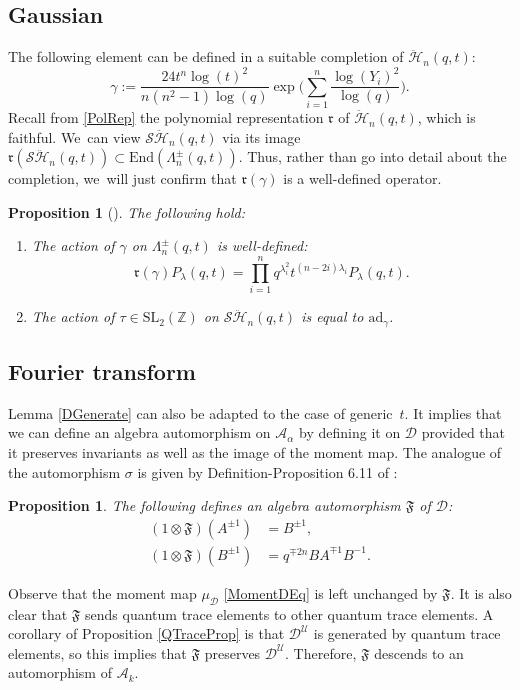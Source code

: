 \documentclass[11pt]{article}
\newcommand{\SL}{\mathrm{SL}}
\newtheorem{prop}[thm]{Proposition}
\theoremstyle{definition}
\newcommand{\ZZ}{\mathbb{Z}}
\newcommand{\UU}{\mathcal{U}}
\newcommand{\DD}{\mathcal{D}}
\newcommand{\AAA}{\mathcal{A}}
\newcommand{\SHH}{\mathcal{S}\ddot{\mathcal{H}}}
\newcommand{\HH}{\ddot{\mathcal{H}}}
\newcommand{\rrr}{\mathfrak{r}}
\begin{document}
\subsection{Gaussian}
The following element can be defined in a suitable completion of $\HH_n(q,t)$:
\begin{equation*}
\gamma:=\frac{24t^n\log(t)^2}{n(n^2-1)\log(q)}\exp\biggl(\sum_{i=1}^n\frac{\log(Y_i)^2}{\log(q)} \biggr).
\end{equation*}
Recall from \ref{PolRep} the polynomial representation $\rrr$ of $\HH_n(q,t)$, which is faithful. We~can view $\SHH_n(q,t)$ via its image $\rrr(\SHH_n(q,t))\subset\mathrm{End}(\Lambda_n^\pm(q,t))$.
Thus, rather than go into detail about the completion, we~will just confirm that $\rrr(\gamma)$ is a well-defined operator.

\begin{prop}[\cite{DiKedqt}]\label{GaussProp}
The following hold:
\begin{enumerate}
\item The action of $\gamma$ on $\Lambda_n^\pm(q,t)$ is well-defined:
\begin{equation}
\rrr(\gamma)P_\lambda(q,t)=\prod_{i=1}^nq^{\lambda_i^2}t^{(n-2i)\lambda_i}P_\lambda(q,t).
\label{GaussEigen}
\end{equation}
\item The action of $\tau\in \SL_2(\ZZ)$ on $\SHH_n(q,t)$ is equal to $\mathrm{ad}_\gamma$.
\end{enumerate}
\end{prop}

\subsection{Fourier transform}
Lemma \ref{DGenerate} can also be adapted to the case of generic~$t$.
It implies that we can define an algebra automorphism on $\AAA_\alpha$ by defining it on $\DD$ provided that it preserves invariants as well as the image of the moment map.
The analogue of the automorphism $\sigma$ is given by Definition-Proposition 6.11 of \cite{JordanMult}:
\begin{prop}
The following defines an algebra automorphism $\mathfrak{F}$ of $\DD$:
\begin{align*}
(1\otimes \mathfrak{F})(A^{\pm 1})&= B^{\pm 1}, \\
(1\otimes\mathfrak{F})(B^{\pm 1})&=q^{\mp 2n}BA^{\mp 1}B^{-1}.
\end{align*}
\end{prop}
Observe that the moment map $\mu_\DD$ \eqref{MomentDEq} is left unchanged by $\mathfrak{F}$.
It is also clear that $\mathfrak{F}$ sends quantum trace elements to other quantum trace elements.
A corollary of Proposition \ref{QTraceProp} is that $\DD^\UU$ is generated by quantum trace elements, so this implies that $\mathfrak{F}$ preserves $\DD^\UU$.
Therefore, $\mathfrak{F}$ descends to an automorphism of $\AAA_k$.
\end{document}
